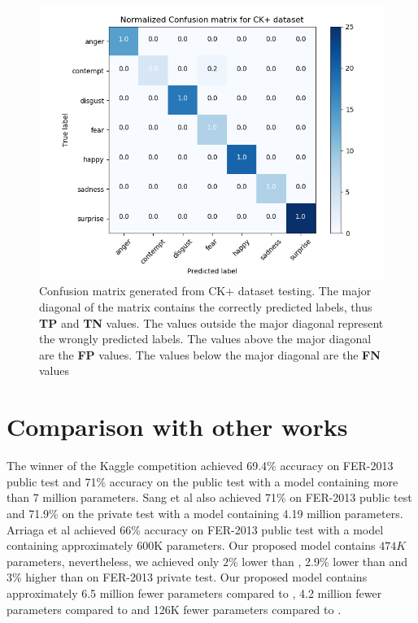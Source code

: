 \documentclass[master]{thesis-uestc}
\begin{document}
\begin{figure}[ht]
\includegraphics[width=5in]{pic/ck+_cm.png}
\caption{Confusion matrix generated from CK+ dataset testing. The major diagonal of the matrix contains the correctly predicted labels, thus \textbf{TP} and \textbf{TN} values. The values outside the major diagonal represent the wrongly predicted labels. The values above the major diagonal are the \textbf{FP} values. The values below the major diagonal are the \textbf{FN} values}
\label{ck+_cm}
\end{figure}

\section{Comparison with other works}
The winner of the Kaggle competition \cite{tang2018} achieved 69.4\% accuracy on FER-2013 public test and 71\% accuracy on the public test with a model containing more than 7 million parameters. Sang et al \cite{sang-2017} also achieved 71\% on FER-2013 public test and 71.9\% on the private test with a model containing 4.19 million parameters. Arriaga et al\cite{DBLP:journals/corr/abs-1710-07557} achieved 66\% accuracy on FER-2013 public test with a model containing approximately 600K parameters. Our proposed model contains $474K$ parameters, nevertheless, we achieved only $2\%$ lower than \cite{tang2018}, 2.9\% lower than \cite{sang-2017} and 3\% higher than \cite{DBLP:journals/corr/abs-1710-07557} on FER-2013 private test. Our proposed model contains approximately 6.5 million fewer parameters compared to \cite{tang2018}, 4.2 million fewer parameters compared to \cite{sang-2017} and 126K fewer parameters compared to \cite{DBLP:journals/corr/abs-1710-07557}.
\end{document}

